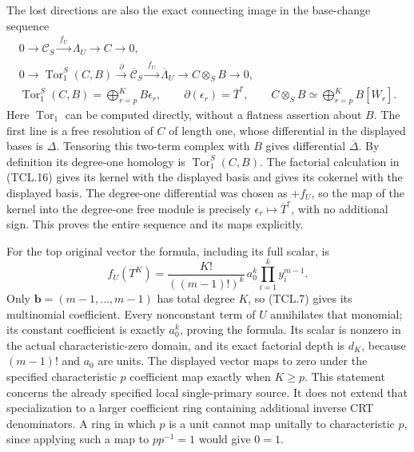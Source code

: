 The lost directions are also the exact connecting image in the
base-change sequence
\[
 \begin{gathered}
 0\longrightarrow\mathcal C_S\xrightarrow{\ f_U\ }
             \Lambda_U\longrightarrow C\longrightarrow0,\\
 0\longrightarrow\operatorname{Tor}_1^S(C,B)
    \xrightarrow{\ \partial\ }\overline{\mathcal C}_S
    \xrightarrow{\ \overline f_U\ }\overline\Lambda_U
    \longrightarrow C\otimes_S B\longrightarrow0,\\
 \operatorname{Tor}_1^S(C,B)=\bigoplus_{r=p}^K B\epsilon_r,
       \qquad \partial(\epsilon_r)=\overline T^r,
       \qquad C\otimes_S B\simeq
                    \bigoplus_{r=p}^K B[\overline W_r].
 \end{gathered}
 \tag{TCL.19}\label{eq:tcl-tor}
\]
Here \(\operatorname{Tor}_1\) can be computed directly, without
a flatness assertion about \(B\). The first line is a free
resolution of \(C\) of length one, whose differential in the
displayed bases is \(\Delta\). Tensoring this two-term complex
with \(B\) gives differential \(\overline\Delta\).
By definition its degree-one homology is
\(\operatorname{Tor}_1^S(C,B)\). The factorial calculation in
(TCL.16) gives its kernel with the displayed basis and gives its
cokernel with the displayed basis. The degree-one differential
was chosen as \(+f_U\), so the map of the kernel into the
degree-one free module is precisely
\(\epsilon_r\mapsto\overline T^r\), with no additional sign.
This proves the entire sequence and its maps explicitly.

For the top original vector the formula, including its full scalar, is
\[
 f_U(T^K)=\frac{K!}{((m-1)!)^k}\,a_0^k
                    \prod_{i=1}^k y_i^{m-1}.
 \tag{TCL.20}\label{eq:tcl-terminal}
\]
Only \(\mathbf b=(m-1,\ldots,m-1)\) has total degree \(K\),
so (TCL.7) gives its multinomial coefficient. Every nonconstant
term of \(U\) annihilates that monomial; its constant coefficient
is exactly \(a_0^k\), proving the formula. Its scalar is nonzero
in the actual characteristic-zero domain, and its exact factorial
depth is \(d_K\), because \((m-1)!\) and \(a_0\) are units.
The displayed vector maps to zero under the specified characteristic
\(p\) coefficient map exactly when \(K\geq p\). This statement
concerns the already specified local single-primary source. It does
not extend that specialization to a larger coefficient ring containing
additional inverse CRT denominators. A ring in which \(p\) is a
unit cannot map unitally to characteristic \(p\), since applying
such a map to \(p p^{-1}=1\) would give \(0=1\).

